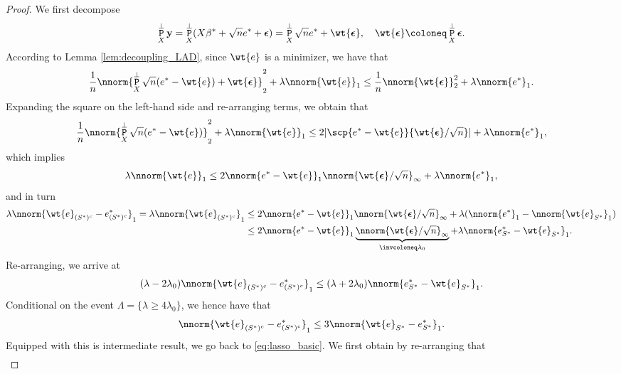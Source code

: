 \documentclass[11pt]{article}
\DeclareMathOperator{\pr}{\texttt{P}}
\def\y{\mathbf{y}}
\def\eps{\boldsymbol{\epsilon}}
\begin{document}
\begin{proof} We first decompose
\begin{equation*}
  \pr_X^{\perp} \y = \pr_X^{\perp} (X \beta^* + \sqrt{n} e^* + \eps) = \pr_X^{\perp} \sqrt{n} e^*  + \wt{\eps}, \quad
  \wt{\eps} \coloneq \pr_X^{\perp} \eps.  
\end{equation*}
According to Lemma \ref{lem:decoupling_LAD}, since $\wt{e}$ is a minimizer, we have that
\begin{equation*}
  \frac{1}{n} \nnorm{\pr_X^{\perp} \sqrt{n}   (e^* - \wt{e}) + \wt{\eps}}_2^2 + \lambda \nnorm{\wt{e}}_1 \leq
  \frac{1}{n} \nnorm{\wt{\eps}}_2^2  + \lambda \nnorm{e^*}_1. 
\end{equation*}
Expanding the square on the left-hand side and re-arranging terms, we obtain that
\begin{equation}\label{eq:lasso_basic}
\frac{1}{n} \nnorm{\pr_X^{\perp} \sqrt{n}   (e^* - \wt{e})}_2^2 + \lambda \nnorm{\wt{e}}_1 \leq 2 |\scp{e^* - \wt{e}}{\wt{\eps}/\sqrt{n}}| + \lambda \nnorm{e^*}_1, 
\end{equation}
which implies
\begin{equation*}
 \lambda \nnorm{\wt{e}}_1 \leq 2 \nnorm{e^* - \wt{e}}_{1} \nnorm{\wt{\eps}/\sqrt{n}}_{\infty} + \lambda \nnorm{e^*}_1,
\end{equation*}
and in turn
\begin{align*}
  \lambda \nnorm{\wt{e}_{(S^*)^c} - e_{(S^*)^c}^*}_1 = \lambda \nnorm{\wt{e}_{(S^*)^c}}_1 &\leq 2 \nnorm{e^* - \wt{e}}_{1} \nnorm{\wt{\eps}/\sqrt{n}}_{\infty} + \lambda (\nnorm{e^*}_1 - \nnorm{\wt{e}_{S^*}}_1) \\
  &\leq  2 \nnorm{e^* - \wt{e}}_{1} \underbrace{\nnorm{\wt{\eps}/\sqrt{n}}_{\infty}}_{\invcoloneq \lambda_0} + \lambda \nnorm{e_{S^*}^*- \wt{e}_{S^*}}_1. 
\end{align*}
Re-arranging, we arrive at 
\begin{equation*}
(\lambda - 2\lambda_0) \nnorm{\wt{e}_{(S^*)^c} - e_{(S^*)^c}^*}_1 \leq (\lambda + 2 \lambda_0) \nnorm{e_{S^*}^*- \wt{e}_{S^*}}_1. 
\end{equation*}
Conditional on the event $\Lambda =\{\lambda \geq 4 \lambda_0 \}$, we hence have that
\begin{equation}\label{eq:cone_condition}
  \nnorm{\wt{e}_{(S^*)^c} - e_{(S^*)^c}^*}_1 \leq 3 \nnorm{\wt{e}_{S^*} - e_{S^*}^*}_1.
\end{equation}
\noindent Equipped with this is intermediate result, we go back to \eqref{eq:lasso_basic}. We first
obtain by re-arranging that 
\begin{align*}

\end{align*}
\end{proof}
\end{document}
